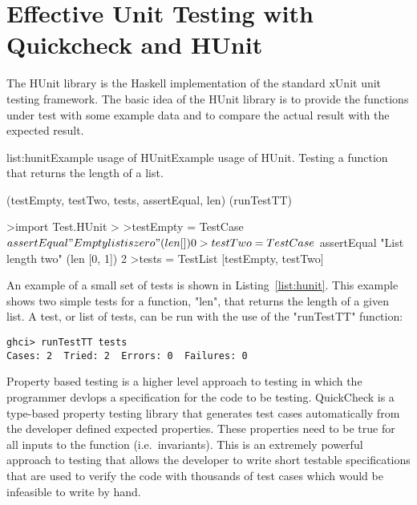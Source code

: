 \section{Effective Unit Testing with Quickcheck and HUnit}
\label{sec:testing}



The HUnit library is the Haskell implementation of the standard xUnit unit testing framework. The
basic idea of the HUnit library is to provide the functions under test with some example data
and to compare the actual result with the expected result.

\vspace{-0.5em}
\begin{listing}{list:hunit}{Example usage of HUnit}{Example usage of HUnit. Testing a function that returns the length of a list.}{}
\end{listing}\vspace{-1.5em}

\functions(testEmpty, testTwo, tests, assertEqual, len)
\functions(runTestTT)
\begin{haskell}
>import Test.HUnit
>
>testEmpty = TestCase $ assertEqual "Empty list is zero" (len []) 0
>testTwo = TestCase $ assertEqual "List length two" (len [0, 1]) 2
>tests = TestList [testEmpty, testTwo]

\end{haskell}
\noindent An example of a small set of tests is shown in Listing~\ref{list:hunit}. This example shows
two simple tests for a function, "len", that returns the length of a given list.
A test, or list of tests, can be run with the use of the "runTestTT" function:

\begin{verbatim}
ghci> runTestTT tests
Cases: 2  Tried: 2  Errors: 0  Failures: 0
\end{verbatim}


Property based testing is a higher level approach to testing in which the programmer devlops a specification
for the code to be testing. QuickCheck is a type-based property testing library that generates test
cases automatically from the developer defined expected properties.\cite{claessen2000} These properties
need to be true for all inputs to the function (i.e.\ invariants). This is an extremely
powerful approach to testing that allows the developer to write short testable specifications that
are used to verify the code with thousands of test cases which would be infeasible to write by hand.

